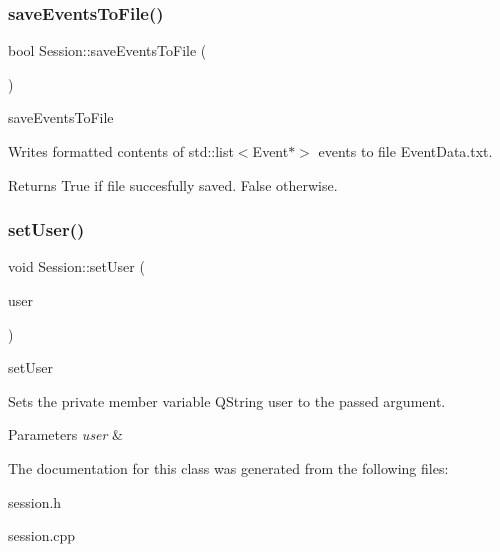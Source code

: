 \subsubsection{\texorpdfstring{save\+Events\+To\+File()}{saveEventsToFile()}}
{\footnotesize\ttfamily bool Session\+::save\+Events\+To\+File (\begin{DoxyParamCaption}{ }\end{DoxyParamCaption})}



save\+Events\+To\+File 

Writes formatted contents of std\+::list$<$\+Event$\ast$$>$ events to file Event\+Data.\+txt. \begin{DoxyReturn}{Returns}
True if file succesfully saved. False otherwise. 
\end{DoxyReturn}
\mbox{\label{class_session_a3e4500bdcf80458ae14dde3eb413adb8}} 
\subsubsection{\texorpdfstring{set\+User()}{setUser()}}
{\footnotesize\ttfamily void Session\+::set\+User (\begin{DoxyParamCaption}\item[{Q\+String}]{user }\end{DoxyParamCaption})}



set\+User 

Sets the private member variable Q\+String user to the passed argument. 
\begin{DoxyParams}{Parameters}
{\em user} & \\
\hline
\end{DoxyParams}


The documentation for this class was generated from the following files\+:\begin{DoxyCompactItemize}
\item 
session.\+h\item 
session.\+cpp\end{DoxyCompactItemize}
